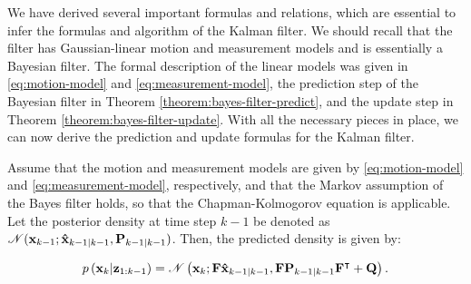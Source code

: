 We have derived several important formulas and relations, which are essential to infer the formulas and algorithm of the Kalman filter. We should recall that the filter has Gaussian-linear motion and measurement models and is essentially a Bayesian filter. The formal description of the linear models was given in \ref{eq:motion-model} and \ref{eq:measurement-model}, the prediction step of the Bayesian filter in Theorem \ref{theorem:bayes-filter-predict}, and the update step in Theorem \ref{theorem:bayes-filter-update}. With all the necessary pieces in place, we can now derive the prediction and update formulas for the Kalman filter.

\begin{theorem}\label{theorem:kalman-predict}
    Assume that the motion and measurement models are given by \ref{eq:motion-model} and \ref{eq:measurement-model}, respectively, and that the Markov assumption of the Bayes filter holds, so that the Chapman-Kolmogorov equation is applicable. Let the posterior density at time step $k-1$ be denoted as $\mathscr{N}(\vecat{x}{k-1}; \vecat{\hat{x}}{k-1|k-1}, \vecat{P}{k-1|k-1})$. Then, the predicted density is given by:

    \begin{equation}
        p\left(\vecat{x}{k} | \vecat{z}{1:k-1}\right)
        = \mathscr{N}\left(
                \vecat{x}{k};
                \mathbf{F} \vecat{\hat{x}}{k-1|k-1},
                \mathbf{F} \vecat{P}{k-1|k-1} \mathbf{F}^\intercal + \mathbf{Q}
            \right).
    \end{equation}
\end{theorem}

